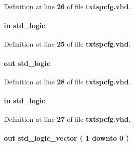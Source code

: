 Definition at line {\bf 26} of file {\bf txtspcfg.\+vhd}.

\paragraph[{sdin}]{ {\bfseries \textcolor{keywordflow}{in}\textcolor{vhdlchar}{ }} {\bfseries \textcolor{comment}{std\+\_\+logic}\textcolor{vhdlchar}{ }} \hspace{0.3cm}{\ttfamily [Port]}}\label{classtxtspcfg_a689a085f705c45ec3c2821cbe3a33b19}


Definition at line {\bf 25} of file {\bf txtspcfg.\+vhd}.

\paragraph[{sdout}]{ {\bfseries \textcolor{keywordflow}{out}\textcolor{vhdlchar}{ }} {\bfseries \textcolor{comment}{std\+\_\+logic}\textcolor{vhdlchar}{ }} \hspace{0.3cm}{\ttfamily [Port]}}\label{classtxtspcfg_aa9859b1193c781bb51a2e16215d90fb3}


Definition at line {\bf 28} of file {\bf txtspcfg.\+vhd}.

\paragraph[{sen}]{ {\bfseries \textcolor{keywordflow}{in}\textcolor{vhdlchar}{ }} {\bfseries \textcolor{comment}{std\+\_\+logic}\textcolor{vhdlchar}{ }} \hspace{0.3cm}{\ttfamily [Port]}}\label{classtxtspcfg_a5e69a30218f15bf1e4421d24cad846c0}


Definition at line {\bf 27} of file {\bf txtspcfg.\+vhd}.

\paragraph[{spi\+\_\+config\+\_\+controls}]{ {\bfseries \textcolor{keywordflow}{out}\textcolor{vhdlchar}{ }} {\bfseries \textcolor{comment}{std\+\_\+logic\+\_\+vector}\textcolor{vhdlchar}{ }\textcolor{vhdlchar}{(}\textcolor{vhdlchar}{ }\textcolor{vhdlchar}{ } \textcolor{vhdldigit}{1} \textcolor{vhdlchar}{ }\textcolor{keywordflow}{downto}\textcolor{vhdlchar}{ }\textcolor{vhdlchar}{ } \textcolor{vhdldigit}{0} \textcolor{vhdlchar}{ }\textcolor{vhdlchar}{)}\textcolor{vhdlchar}{ }} \hspace{0.3cm}{\ttfamily [Port]}}\label{classtxtspcfg_ad6db5234a147db1528ee4baa0d3cddd8}


